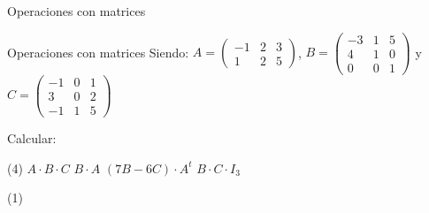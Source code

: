 \documentclass[8pt]{beamer}
\begin{document}
\begin{frame}[t]{Operaciones con matrices}
\begin{exampleblock}{Operaciones con matrices}
Siendo: $   A= \begin{pmatrix}
-1 & 2 & 3 \\ 1 & 2 & 5
\end{pmatrix}$, $B=\begin{pmatrix}
-3 & 1 & 5 \\ 4 & 1 & 0 \\ 0 & 0 & 1
\end{pmatrix}$ y  $C=\begin{pmatrix}
-1 & 0 & 1 \\ 3 & 0 & 2 \\ -1 & 1 & 5
 \end{pmatrix}$

Calcular:
\begin{tasks}[label=\alph*)](4)
\task $A \cdot B \cdot C$
\task $B \cdot A$
\task $(7B - 6C)\cdot A^t$
\task $B\cdot C \cdot I_3$
\end{tasks}

\end{exampleblock}


\begin{tasks}[label=\alph*)](1)
\task {}

\end{tasks}
\end{frame}
\end{document}
